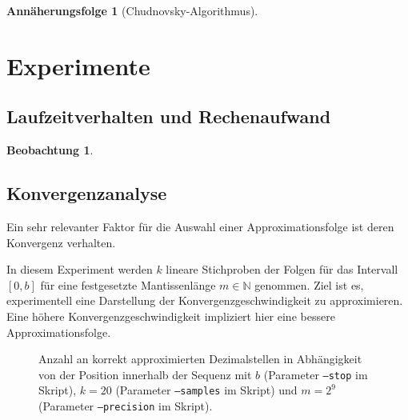 \documentclass{scrartcl}
\theoremstyle{definition}
\newtheorem{approximation sequence}{Annäherungsfolge}
\newtheorem{observation}{Beobachtung}
\begin{document}
\begin{approximation sequence}[Chudnovsky-Algorithmus]

\end{approximation sequence}

\section{Experimente}

\subsection{Laufzeitverhalten und Rechenaufwand}

\begin{observation}

\end{observation}

\subsection{Konvergenzanalyse}

Ein sehr relevanter Faktor für die Auswahl einer Approximationsfolge ist deren
Konvergenz verhalten.

In diesem Experiment werden \(k\) lineare Stichproben der Folgen für das
Intervall \([0, b]\) für eine festgesetzte Mantissenlänge \(m \in \mathbb{N}\)
genommen. Ziel ist es, experimentell eine Darstellung der
Konvergenzgeschwindigkeit zu approximieren. Eine höhere
Konvergenzgeschwindigkeit impliziert hier eine bessere Approximationsfolge.

\begin{figure}[H]
    \centering
    \subfloat[\centering \(b = 10^2\)]{{ }}
    \subfloat[\centering \(b = 10^6\)]{{ }}
    \caption{%
        Anzahl an korrekt approximierten Dezimalstellen in Abhängigkeit von der
        Position innerhalb der Sequenz mit \(b\) (Parameter \texttt{--stop} im
        Skript), \(k = 20\) (Parameter \texttt{--samples} im Skript) und \(m =
        2^9\) (Parameter \texttt{--precision} im Skript). }
        \label{fig:convergence-analysis}
\end{figure}
\end{document}
